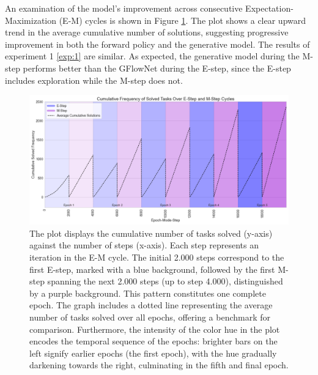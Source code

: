 An examination of the model's improvement across consecutive Expectation-Maximization (E-M) cycles is shown in Figure \ref{fig:em_cycles}. The plot shows a clear upward trend in the average cumulative number of solutions, suggesting progressive improvement in both the forward policy and the generative model. The results of experiment 1 \ref{exp:1} are similar. As expected, the generative model during the M-step performs better than the GFlowNet during the E-step, since the E-step includes exploration while the M-step does not.

\begin{figure}
    \centering
    \includegraphics[width=\textwidth]{../img/em_cycles_depth_3_48_tasks2023-12-07 22:24:45.png}
    \caption{The plot displays the cumulative number of tasks solved (y-axis) against the number of steps (x-axis). Each step represents an iteration in the E-M cycle. The initial 2.000 steps correspond to the first E-step, marked with a blue background, followed by the first M-step spanning the next 2.000 steps (up to step 4.000), distinguished by a purple background. This pattern constitutes one complete epoch. The graph includes a dotted line representing the average number of tasks solved over all epochs, offering a benchmark for comparison. Furthermore, the intensity of the color hue in the plot encodes the temporal sequence of the epochs: brighter bars on the left signify earlier epochs (the first epoch), with the hue gradually darkening towards the right, culminating in the fifth and final epoch.}
    \label{fig:em_cycles}
\end{figure}



